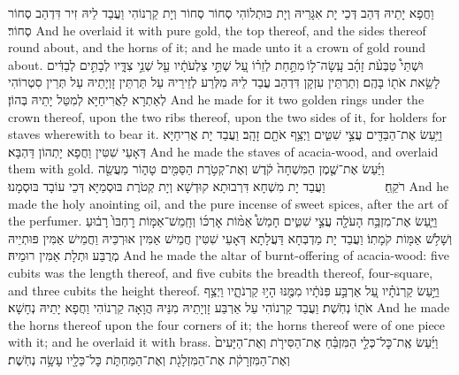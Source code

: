 {וַחֲפָא יָתֵיהּ דְּהַב דְּכֵי יָת אִגָּרֵיהּ וְיָת כּוּתְלוֹהִי סְחוֹר סְחוֹר וְיָת קַרְנוֹהִי וַעֲבַד לֵיהּ זִיר דִּדְהַב סְחוֹר סְחוֹר׃}
{And he overlaid it with pure gold, the top thereof, and the sides thereof round about, and the horns of it; and he made unto it a crown of gold round about.}{}
{וּשְׁתֵּי֩ טַבְּעֹ֨ת זָהָ֜ב עָֽשָׂה־ל֣וֹ \legarmeh  מִתַּ֣חַת לְזֵר֗וֹ עַ֚ל שְׁתֵּ֣י צַלְעֹתָ֔יו עַ֖ל שְׁנֵ֣י צִדָּ֑יו לְבָתִּ֣ים לְבַדִּ֔ים לָשֵׂ֥את אֹת֖וֹ בָּהֶֽם׃}
{וְתַרְתֵּין עִזְקָן דִּדְהַב עֲבַד לֵיהּ מִלְּרַע לְזֵירֵיהּ עַל תַּרְתֵּין זָוְיָתֵיהּ עַל תְּרֵין סִטְרוֹהִי לְאַתְרָא לַאֲרִיחַיָּא לְמִטַּל יָתֵיהּ בְּהוֹן׃}
{And he made for it two golden rings under the crown thereof, upon the two ribs thereof, upon the two sides of it, for holders for staves wherewith to bear it.}{}
{וַיַּ֥עַשׂ אֶת־הַבַּדִּ֖ים עֲצֵ֣י שִׁטִּ֑ים וַיְצַ֥ף אֹתָ֖ם זָהָֽב׃}
{וַעֲבַד יָת אֲרִיחַיָּא דְּאָעֵי שִׁטִּין וַחֲפָא יָתְהוֹן דַּהְבָּא׃}
{And he made the staves of acacia-wood, and overlaid them with gold.}{}
{וַיַּ֜עַשׂ אֶת־שֶׁ֤מֶן הַמִּשְׁחָה֙ קֹ֔דֶשׁ וְאֶת־קְטֹ֥רֶת הַסַּמִּ֖ים טָה֑וֹר מַעֲשֵׂ֖ה רֹקֵֽחַ׃ \setuma         }
{וַעֲבַד יָת מִשְׁחָא דִּרְבוּתָא קוּדְשָׁא וְיָת קְטֹרֶת בּוּסְמַיָּא דְּכֵי עוֹבָד בּוּסְמָנוּ׃}
{And he made the holy anointing oil, and the pure incense of sweet spices, after the art of the perfumer.}{}
\newperek
{}%
{וַיַּ֛עַשׂ אֶת־מִזְבַּ֥ח הָעֹלָ֖ה עֲצֵ֣י שִׁטִּ֑ים חָמֵשׁ֩ אַמּ֨וֹת אׇרְכּ֜וֹ וְחָֽמֵשׁ־אַמּ֤וֹת רׇחְבּוֹ֙ רָב֔וּעַ וְשָׁלֹ֥שׁ אַמּ֖וֹת קֹמָתֽוֹ׃}
{וַעֲבַד יָת מַדְבְּחָא דַּעֲלָתָא דְּאָעֵי שִׁטִּין חֲמֵישׁ אַמִּין אוּרְכֵּיהּ וַחֲמֵישׁ אַמִּין פּוּתְיֵיהּ מְרֻבַּע וּתְלָת אַמִּין רוּמֵיהּ׃}
{And he made the altar of burnt-offering of acacia-wood: five cubits was the length thereof, and five cubits the breadth thereof, four-square, and three cubits the height thereof.}{}
{וַיַּ֣עַשׂ קַרְנֹתָ֗יו עַ֚ל אַרְבַּ֣ע פִּנֹּתָ֔יו מִמֶּ֖נּוּ הָי֣וּ קַרְנֹתָ֑יו וַיְצַ֥ף אֹת֖וֹ נְחֹֽשֶׁת׃}
{וַעֲבַד קַרְנוֹהִי עַל אַרְבַּע זָוְיָתֵיהּ מִנֵּיהּ הֲוָאָה קַרְנוֹהִי וַחֲפָא יָתֵיהּ נְחָשָׁא׃}
{And he made the horns thereof upon the four corners of it; the horns thereof were of one piece with it; and he overlaid it with brass.}{}
{וַיַּ֜עַשׂ אֶֽת־כׇּל־כְּלֵ֣י הַמִּזְבֵּ֗חַ אֶת־הַסִּירֹ֤ת וְאֶת־הַיָּעִים֙ וְאֶת־הַמִּזְרָקֹ֔ת אֶת־הַמִּזְלָגֹ֖ת וְאֶת־הַמַּחְתֹּ֑ת כׇּל־כֵּלָ֖יו עָשָׂ֥ה נְחֹֽשֶׁת׃}
